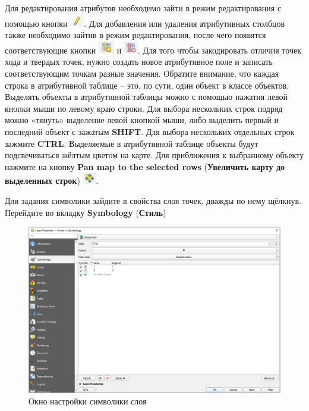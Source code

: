\documentclass[
  12pt,
]{book}
\begin{document}
Для редактирования атрибутов необходимо зайти в режим редактирования с помощью кнопки \includegraphics{images/Practice/Edit.png}. Для добавления или удаления атрибутивных столбцов также необходимо зайтив в режим редактирования, после чего появятся соответствующие кнопки \includegraphics{images/Practice/New_field.png} и \includegraphics{images/Practice/Delete_field.png}. Для того чтобы закодировать отличия точек хода и твердых точек, нужно создать новое атрибутивное поле и записать соответствующим точкам разные значения. Обратите внимание, что каждая строка в атрибутивной таблице -- это, по сути, один объект в классе объектов. Выделять объекты в атрибутивной таблицы можно с помощью нажатия левой кнопки мыши по левому краю строки. Для выбора нескольких строк подряд можно «тянуть» выделение левой кнопкой мыши, либо выделить первый и последний объект с зажатым \textbf{SHIFT}. Для выбора нескольких отдельных строк зажмите \textbf{CTRL}. Выделяемые в атрибутивной таблице объекты будут подсвечиваться жёлтым цветом на карте. Для приближения к выбранному объекту нажмите на кнопку \textbf{Pan map to the selected rows} (\textbf{Увеличить карту до выделенных строк}) \includegraphics{images/Practice/Zoom_to_selection.png}.

Для задания символики зайдите в свойства слоя точек, дважды по нему щёлкнув. Перейдите во вкладку \textbf{Symbology} (\textbf{Стиль})

\begin{figure}
\centering
\includegraphics{images/Practice/Point_Symbology.png}
\caption{Окно настройки символики слоя}
\end{figure}
\end{document}
